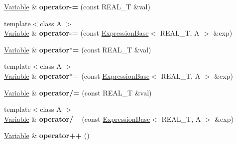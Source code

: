 \begin{DoxyCompactItemize}
\item 
\hypertarget{structatl_1_1_variable_ab822ce13f7a8d979c7ae0253a5adea07}{\hyperlink{structatl_1_1_variable}{Variable} \& {\bfseries operator-\/=} (const R\+E\+A\+L\+\_\+\+T \&val)}\label{structatl_1_1_variable_ab822ce13f7a8d979c7ae0253a5adea07}

\item 
\hypertarget{structatl_1_1_variable_ad1be31d4f6e25cb4e26b0fb6cf61e91a}{{\footnotesize template$<$class A $>$ }\\\hyperlink{structatl_1_1_variable}{Variable} \& {\bfseries operator-\/=} (const \hyperlink{structatl_1_1_expression_base}{Expression\+Base}$<$ R\+E\+A\+L\+\_\+\+T, A $>$ \&exp)}\label{structatl_1_1_variable_ad1be31d4f6e25cb4e26b0fb6cf61e91a}

\item 
\hypertarget{structatl_1_1_variable_a625c5a60771393a83e51bd605132987a}{\hyperlink{structatl_1_1_variable}{Variable} \& {\bfseries operator$\ast$=} (const R\+E\+A\+L\+\_\+\+T \&val)}\label{structatl_1_1_variable_a625c5a60771393a83e51bd605132987a}

\item 
\hypertarget{structatl_1_1_variable_abd8effad2f281d679c6cc4ad8d92bcb5}{{\footnotesize template$<$class A $>$ }\\\hyperlink{structatl_1_1_variable}{Variable} \& {\bfseries operator$\ast$=} (const \hyperlink{structatl_1_1_expression_base}{Expression\+Base}$<$ R\+E\+A\+L\+\_\+\+T, A $>$ \&exp)}\label{structatl_1_1_variable_abd8effad2f281d679c6cc4ad8d92bcb5}

\item 
\hypertarget{structatl_1_1_variable_afd5cf7762056c7157936b928f9d98007}{\hyperlink{structatl_1_1_variable}{Variable} \& {\bfseries operator/=} (const R\+E\+A\+L\+\_\+\+T \&val)}\label{structatl_1_1_variable_afd5cf7762056c7157936b928f9d98007}

\item 
\hypertarget{structatl_1_1_variable_a0d179dc181b83542633581994396b719}{{\footnotesize template$<$class A $>$ }\\\hyperlink{structatl_1_1_variable}{Variable} \& {\bfseries operator/=} (const \hyperlink{structatl_1_1_expression_base}{Expression\+Base}$<$ R\+E\+A\+L\+\_\+\+T, A $>$ \&exp)}\label{structatl_1_1_variable_a0d179dc181b83542633581994396b719}

\item 
\hypertarget{structatl_1_1_variable_ac0b77adb93d2f9cb6ba8f58ff7082c66}{\hyperlink{structatl_1_1_variable}{Variable} \& {\bfseries operator++} ()}\label{structatl_1_1_variable_ac0b77adb93d2f9cb6ba8f58ff7082c66}


\end{DoxyCompactItemize}
